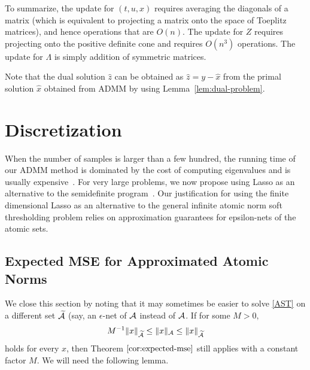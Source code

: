 To summarize, the update for $(t,u,x)$ requires averaging the diagonals of a
matrix (which is equivalent to projecting a matrix onto the space of Toeplitz
matrices), and hence operations that are $O(n)$. The update for $Z$ requires
projecting onto the positive definite cone and requires $O(n^3)$ operations. The update for $\Lambda$ is simply
addition of symmetric matrices.  

Note that the dual solution $\hat{z}$ can be obtained as $\hat{z} = y - \hat{x}$ from the
primal solution $\hat{x}$ obtained from ADMM by using
Lemma~\ref{lem:dual-problem}.


\section{Discretization}

When the number of samples is larger than a few hundred, the running time of our
ADMM method is dominated by the cost of computing eigenvalues and is usually
expensive~\cite{btr12}. For very large problems, we now propose using Lasso as
an alternative to the semidefinite program~. Our justification for using the finite dimensional Lasso as an alternative to the general infinite atomic norm soft thresholding problem relies on approximation guarantees for epsilon-nets of the atomic sets.

\subsection{Expected MSE for Approximated Atomic Norms}
\label{proof:expected-mse-approx}

We close this section by noting that it may sometimes be easier to solve
\eqref{AST} on a different set $\widetilde{\mathcal{A}}$ (say, an $\epsilon$-net of
$\mathcal{A}$ instead of $\mathcal{A}$. If for some $M>0,$
\[
M^{-1}\lVert x\rVert_{\widetilde{\mathcal{A}}} \leq \lVert x\rVert_{\mathcal{A}} \leq 
\lVert x\rVert_{\widetilde{\mathcal{A}}}
\] 
holds for every $x$, then Theorem $\ref{cor:expected-mse}$ still applies with a 
constant factor $M$. We will need the following lemma.

